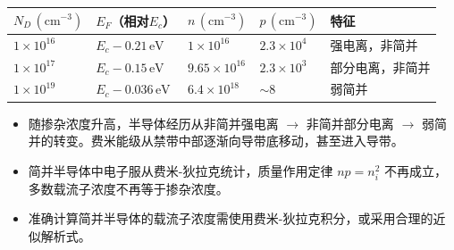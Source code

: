 \begin{formulabox}[答案汇总]
\begin{center}
\begin{tabular}{lllll}
\toprule
$N_D\,(\text{cm}^{-3})$ & $E_F$（相对$E_c$） & $n\,(\text{cm}^{-3})$ & $p\,(\text{cm}^{-3})$ & 特征 \\
\midrule
$1\times10^{16}$ & $E_c-0.21\,\text{eV}$ & $1\times10^{16}$ & $2.3\times10^4$ & 强电离，非简并 \\
$1\times10^{17}$ & $E_c-0.15\,\text{eV}$ & $9.65\times10^{16}$ & $2.3\times10^3$ & 部分电离，非简并 \\
$1\times10^{19}$ & $E_c-0.036\,\text{eV}$ & $6.4\times10^{18}$ & $\sim8$ & 弱简并 \\
\bottomrule
\end{tabular}
\end{center}
\end{formulabox}

\begin{insightbox}[物理图像]
\begin{itemize}
    \item 随掺杂浓度升高，半导体经历从非简并强电离 $\to$ 非简并部分电离 $\to$ 弱简并的转变。费米能级从禁带中部逐渐向导带底移动，甚至进入导带。
    \item 简并半导体中电子服从费米-狄拉克统计，质量作用定律 $np=n_i^2$ 不再成立，多数载流子浓度不再等于掺杂浓度。
    \item 准确计算简并半导体的载流子浓度需使用费米-狄拉克积分，或采用合理的近似解析式。
\end{itemize}
\end{insightbox}
